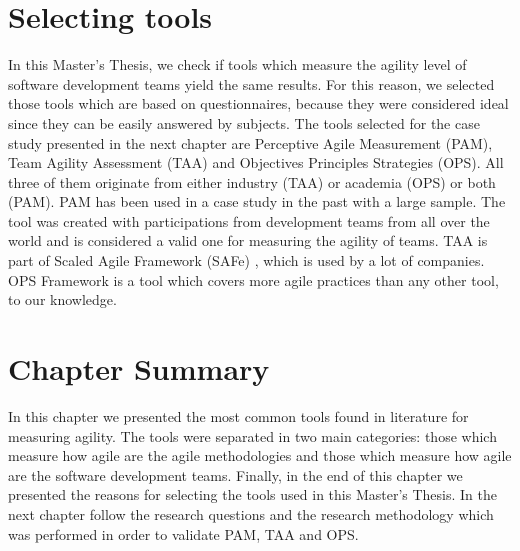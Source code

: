 \section{Selecting tools}
In this Master's Thesis, we check if tools which measure the agility level of software development teams yield the same results. For this reason, we selected those tools which are based on questionnaires, because they were considered ideal since they can be easily answered by subjects. The tools selected for the case study presented in the next chapter are Perceptive Agile Measurement (PAM), Team Agility Assessment (TAA) and Objectives Principles Strategies (OPS). All three of them originate from either industry (\ac{TAA}) or academia (\ac{OPS}) or both (\ac{PAM}). \ac{PAM} has been used in a case study in the past with a large sample. The tool was created with participations from development teams from all over the world and is considered a valid one for measuring the agility of teams. \ac{TAA} is part of Scaled Agile Framework (SAFe) \cite{scaled_agile_framework}, which is used by a lot of companies. \ac{OPS} Framework is a tool which covers more agile practices than any other tool, to our knowledge.

\section{Chapter Summary}
In this chapter we presented the most common tools found in literature for measuring agility. The tools were separated in two main categories: those which measure how agile are the agile methodologies and those which measure how agile are the software development teams. Finally, in the end of this chapter we presented the reasons for selecting the tools used in this Master's Thesis. In the next chapter follow the research questions and the research methodology which was performed in order to validate \ac{PAM}, \ac{TAA} and \ac{OPS}.
